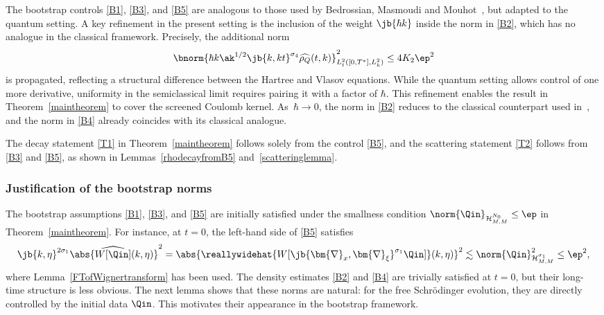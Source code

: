 \begin{remark}The bootstrap controls \eqref{B1}, \eqref{B3}, and \eqref{B5} are analogous to those used by Bedrossian, Masmoudi and Mouhot~\cite{BedrossianMasmoudiMouhot2018}, but adapted to the quantum setting. A key refinement in the present setting is the inclusion of the weight $\jb{\hbar k}$ inside the norm in \eqref{B2}, which has no analogue in the classical framework. Precisely, the additional norm
\begin{align*}
\bnorm{\hbar k\ak^{1/2}\jb{k,kt}^{\sigma_4}\widehat{\rho_Q}(t,k)}_{L^2_{t}([0,T^*],L^2_k)}^2\leq 4K_2\ep^2
\end{align*} is propagated, reflecting a structural difference between the Hartree and Vlasov equations. While the quantum setting allows control of one more derivative, uniformity in the semiclassical limit requires pairing it with a factor of $\hbar$. This refinement enables the result in Theorem~\ref{maintheorem} to cover the screened Coulomb kernel. As~$\hbar\to0$, the norm in \eqref{B2} reduces to the classical counterpart used in~\cite{BedrossianMasmoudiMouhot2018}, and the norm in \eqref{B4} already coincides with its classical analogue.
\end{remark}
\begin{remark}The decay statement \eqref{T1} in Theorem~\ref{maintheorem} follows solely from the control \eqref{B5}, and the scattering statement \eqref{T2} follows from \eqref{B3} and \eqref{B5}, as shown in Lemmas~\ref{rhodecayfromB5} and~\ref{scatteringlemma}.
\end{remark}

\subsubsection{Justification of the bootstrap norms}
The bootstrap assumptions \eqref{B1}, \eqref{B3}, and \eqref{B5} are initially satisfied under the smallness condition \( \norm{\Qin}_{\mathcal H^{N_0}_{M,M}} \leq \ep \) in Theorem~\ref{maintheorem}. For instance, at \( t = 0 \), the left-hand side of \eqref{B5} satisfies
\begin{align*}\jb{k,\eta}^{2\sigma_1}\abs{\widehat{W[\Qin]}(k,\eta)}^2=\abs{\reallywidehat{W[\jb{\bm{\nabla}_x,\bm{\nabla}_\xi}^{\sigma_1}\Qin]}(k,\eta)}^2\lesssim\norm{\Qin}_{\mathcal H^{\sigma_1}_{M,M}}^2\leq\ep^2,
\end{align*}where Lemma~\ref{FTofWignertransform} has been used. The density estimates \eqref{B2} and \eqref{B4} are trivially satisfied at \( t = 0 \), but their long-time structure is less obvious. The next lemma shows that these norms are natural: for the free Schrödinger evolution, they are directly controlled by the initial data \( \Qin \). This motivates their appearance in the bootstrap framework.

